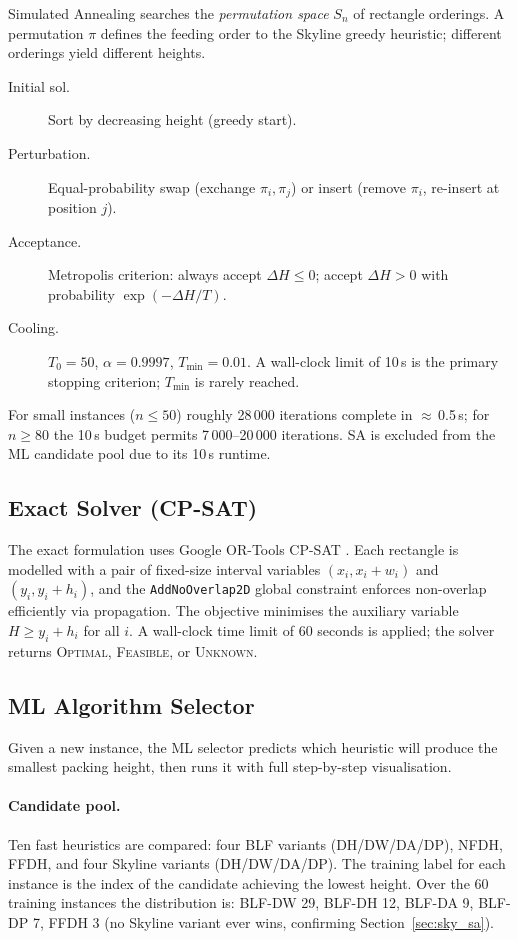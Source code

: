 \documentclass[11pt,a4paper]{article}
\begin{document}
Simulated Annealing \cite{Kirkpatrick1983} searches the \emph{permutation
space} $S_n$ of rectangle orderings.
A permutation $\pi$ defines the feeding order to the Skyline greedy heuristic;
different orderings yield different heights.

\begin{description}
  \item[Initial sol.]  Sort by decreasing height (greedy start).
  \item[Perturbation.] Equal-probability swap (exchange $\pi_i, \pi_j$) or
        insert (remove $\pi_i$, re-insert at position $j$).
  \item[Acceptance.]   Metropolis criterion: always accept $\Delta H \le 0$;
        accept $\Delta H > 0$ with probability $\exp(-\Delta H / T)$.
  \item[Cooling.]      $T_0 = 50$,\; $\alpha = 0.9997$,\; $T_{\min} = 0.01$.
        A wall-clock limit of 10\,s is the primary stopping criterion;
        $T_{\min}$ is rarely reached.
\end{description}

For small instances ($n \le 50$) roughly 28\,000 iterations complete in
$\approx$\,0.5\,s; for $n \ge 80$ the 10\,s budget permits
7\,000--20\,000 iterations.
SA is excluded from the ML candidate pool due to its 10\,s runtime.

\subsection{Exact Solver (CP-SAT)}

The exact formulation uses Google OR-Tools CP-SAT \cite{ORTools}.
Each rectangle is modelled with a pair of fixed-size interval variables
$(x_i, x_i + w_i)$ and $(y_i, y_i + h_i)$, and the \texttt{AddNoOverlap2D}
global constraint enforces non-overlap efficiently via propagation.
The objective minimises the auxiliary variable $H \ge y_i + h_i$ for all $i$.
A wall-clock time limit of 60 seconds is applied; the solver returns
\textsc{Optimal}, \textsc{Feasible}, or \textsc{Unknown}.

\subsection{ML Algorithm Selector}

Given a new instance, the ML selector predicts which heuristic will produce
the smallest packing height, then runs it with full step-by-step visualisation.

\paragraph{Candidate pool.}
Ten fast heuristics are compared: four BLF variants (DH/DW/DA/DP),
NFDH, FFDH, and four Skyline variants (DH/DW/DA/DP).
The training label for each instance is the index of the candidate achieving
the lowest height.
Over the 60 training instances the distribution is:
BLF-DW 29, BLF-DH 12, BLF-DA 9, BLF-DP 7, FFDH 3
(no Skyline variant ever wins, confirming Section~\ref{sec:sky_sa}).
\end{document}
